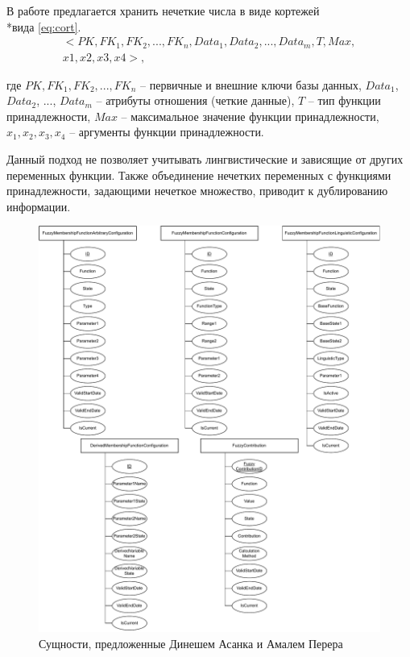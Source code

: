 В работе \cite{StoringFuzzyNums} предлагается хранить нечеткие числа в виде кортежей \\*вида \ref{eq:cort}.
\begin{equation}
\label{eq:cort}
\begin{array}{l}
<PK, FK_1, FK_2, ..., FK_n, Data_1, Data_2, ..., Data_m, T, Max, \\
x1, x2, x3, x4>,
\end{array} 
\end{equation}

где $PK, FK_1, FK_2, ..., FK_n$ -- первичные и внешние ключи базы данных, $Data_1$, $Data_2$, ..., $Data_m$ -- атрибуты отношения (четкие данные), $T$ -- тип функции принадлежности, $Max$ -- максимальное значение функции принадлежности, $x_1, x_2, x_3, x_4$ -- аргументы функции принадлежности.

Данный подход не позволяет учитывать лингвистические и зависящие от других переменных функции. Также объединение нечетких переменных с функциями принадлежности, задающими нечеткое множество, приводит к дублированию информации.

\begin{figure}[H]
	\centering
	\includegraphics[width=0.95\linewidth]{img/Existing1}
	\caption{Сущности, предложенные Динешем Асанка и Амалем Перера}
	\label{fig:existing1}
\end{figure}

